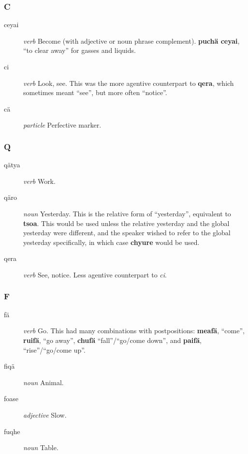 \documentclass{article}
\begin{document}
\subsubsection{C}

\begin{description}
\item [ceyai] \emph{verb} Become (with adjective or noun phrase complement). \textbf{puch\"a ceyai}, ``to clear away'' for gasses and liquids.
\item [ci] \emph{verb} Look, see.  This was the more agentive counterpart to \textbf{qera}, which sometimes meant ``see'', but more often ``notice''.
\item [c\"a] \emph{particle} Perfective marker.
\end{description}

\subsubsection{Q}

\begin{description}
\item [q\"atya] \emph{verb} Work.
\item [q\"aro] \emph{noun} Yesterday.  This is the relative form of ``yesterday'', equivalent to \textbf{tsoa}.  This would be used unless the relative yesterday and the global yesterday were different, and the speaker wished to refer to the global yesterday specifically, in which case \textbf{chyure} would be used.
\item [qera] \emph{verb} See, notice.  Less agentive counterpart to \emph{ci}.
\end{description}

\subsubsection{F}

\begin{description}
\item [f\"a] \emph{verb} Go.  This had many combinations with postpositions: \textbf{meaf\"a}, ``come'', \textbf{ruif\"a}, ``go away'', \textbf{chuf\"a} ``fall''/``go/come down'', and \textbf{paif\"a}, ``rise''/``go/come up''.
\item [fiq\"a] \emph{noun} Animal.
\item [foase] \emph{adjective} Slow.
\item [fuqhe] \emph{noun} Table.
\end{description}
\end{document}
